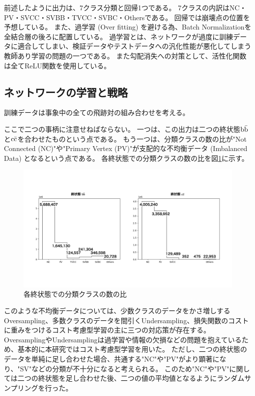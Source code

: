 前述したように出力は、7クラス分類と回帰1つである。
7クラスの内訳はNC・PV・SVCC・SVBB・TVCC・SVBC・Othersである。
回帰では崩壊点の位置を予想している。
また、過学習 (Over fitting) を避ける為、Batch Normalization\cite{BatchNormalizationpaper}を全結合層の後ろに配置している。
過学習とは、ネットワークが過度に訓練データに適合してしまい、検証データやテストデータへの汎化性能が悪化してしまう教師あり学習の問題の一つである。
また勾配消失への対策として、活性化関数は全てReLU関数を使用している。


\subsection{ネットワークの学習と戦略} \label{Net:PM:TrainingandStrategyofPM}

訓練データは事象中の全ての飛跡対の組み合わせを考える。

ここで二つの事柄に注意せねばならない。
一つは、この出力は二つの終状態$\rm b\bar{b}$と$\rm c\bar{c}$を合わせたものという点である。
もう一つは、分類クラスの数の比が"Not Connected (NC)"や"Primary Vertex (PV)"が支配的な不均衡データ (Imbalanced Data) となるという点である。
各終状態での分類クラスの数の比を図\ref{3-3-2-1ImbalancedData}に示す。

\begin{figure}[h]
 \centering
 \includegraphics[width=1.0\textwidth]{Figure/3Networks/3-3-2-1ImbalancedData.png}
 \caption{各終状態での分類クラスの数の比}
 \label{3-3-2-1ImbalancedData}
\end{figure}

このような不均衡データについては、少数クラスのデータをかさ増しするOversampling、多数クラスのデータを間引くUndersampling、損失関数のコストに重みをつけるコスト考慮型学習の主に三つの対応策が存在する。
OversamplingやUndersamplingは過学習や情報の欠損などの問題を抱えているため、基本的に本研究ではコスト考慮型学習を用いた。
ただし、二つの終状態のデータを単純に足し合わせた場合、共通する"NC"や"PV"がより顕著になり、"SV"などの分類が不十分になると考えられる。
このため"NC"や"PV"に関しては二つの終状態を足し合わせた後、二つの値の平均値となるようにランダムサンプリングを行った。

